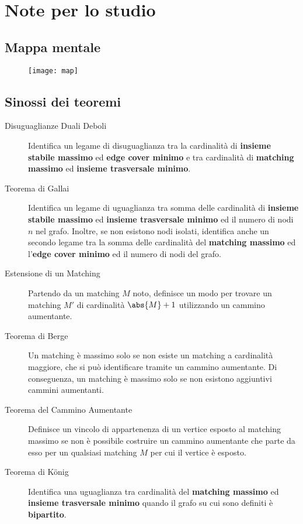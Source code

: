 \documentclass[\main/main.tex]{subfiles}
\begin{document}
\chapter{Note per lo studio}
\section{Mappa mentale}
\begin{figure}
	\texttt{[image: map]}
\end{figure}
\clearpage
\section{Sinossi dei teoremi}
\begin{multicols}{2}
	\begin{description}
		\item[Disuguaglianze Duali Deboli] Identifica un legame di disuguaglianza tra la cardinalità di \textbf{insieme stabile massimo} ed \textbf{edge cover minimo} e tra cardinalità di \textbf{matching massimo} ed \textbf{insieme trasversale minimo}.
		\item[Teorema di Gallai] Identifica un legame di uguaglianza tra somma delle cardinalità di \textbf{insieme stabile massimo} ed \textbf{insieme trasversale minimo} ed il numero di nodi \(n\) nel grafo. Inoltre, se non esistono nodi isolati, identifica anche un secondo legame tra la somma delle cardinalità del \textbf{matching massimo} ed l'\textbf{edge cover minimo} ed il numero di nodi del grafo.
		\item[Estensione di un Matching] Partendo da un matching \(M\) noto, definisce un modo per trovare un matching \(M'\) di cardinalità \(\abs{M}+1\) utilizzando un cammino aumentante.
		\item[Teorema di Berge] Un matching è massimo solo se non esiste un matching a cardinalità maggiore, che si può identificare tramite un cammino aumentante. Di conseguenza, un matching è massimo solo se non esistono aggiuntivi cammini aumentanti.
		\item[Teorema del Cammino Aumentante] Definisce un vincolo di appartenenza di un vertice esposto al matching massimo se non è possibile costruire un cammino aumentante che parte da esso per un qualsiasi matching \(M\) per cui il vertice è esposto.
		\item[Teorema di König] Identifica una uguaglianza tra cardinalità del \textbf{matching massimo} ed \textbf{insieme trasversale minimo} quando il grafo su cui sono definiti è \textbf{bipartito}.

\end{description}
\end{multicols}
\end{document}

